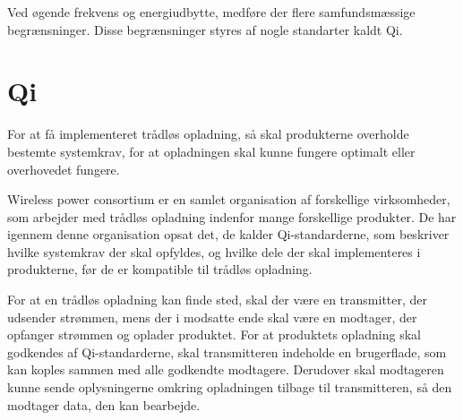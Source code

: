 Ved øgende frekvens og energiudbytte, medføre der flere samfundsmæssige begrænsninger. Disse begrænsninger styres af nogle standarter kaldt Qi. 

\section{Qi}
For at få implementeret trådløs opladning, så skal produkterne overholde bestemte systemkrav, for at opladningen skal kunne fungere optimalt eller overhovedet fungere.

Wireless power consortium er en samlet organisation af forskellige virksomheder, som arbejder med trådløs opladning indenfor mange forskellige produkter. De har igennem denne organisation opsat det, de kalder Qi-standarderne, som beskriver hvilke systemkrav der skal opfyldes, og hvilke dele der skal implementeres i produkterne, før de er kompatible til trådløs opladning.

For at en trådløs opladning kan finde sted, skal der være en transmitter, der udsender strømmen, mens der i modsatte ende skal være en modtager, der opfanger strømmen og oplader produktet. For at produktets opladning skal godkendes af Qi-standarderne, skal transmitteren indeholde en brugerflade, som kan koples sammen med alle godkendte modtagere. Derudover skal modtageren kunne sende oplysningerne omkring opladningen tilbage til transmitteren, så den modtager data, den kan bearbejde.
\newpage